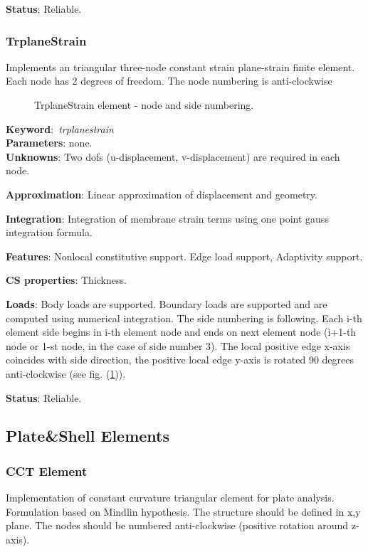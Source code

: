 \documentclass[12pt,dvips]{article}
\newcommand{\descitem}[1]{{\noindent \bf #1}:}
\newcommand{\elemkeyword}[1]{\descitem{Keyword}~{\em #1}}
\begin{document}
\descitem{Status} Reliable.


\subsubsection{TrplaneStrain}
Implements an triangular three-node  constant strain plane-strain  
finite element. Each node has 2 degrees of freedom.
The node numbering is anti-clockwise

\begin{figure}[htb]
\begin{center}\end{center}
\caption{TrplaneStrain element - node and side numbering.}
\label{TrplaneStrain}
\end{figure}

\elemkeyword{trplanestrain}\\
\descitem{Parameters} none.\\
\descitem{Unknowns}
Two dofs (u-displacement, v-displacement) are required in each node.

\descitem{Approximation} Linear approximation of displacement and
geometry.

\descitem{Integration}
Integration of membrane strain terms using one point gauss integration formula.

\descitem{Features} Nonlocal constitutive support. Edge load
support, Adaptivity support.

\descitem{CS properties} Thickness. 

\descitem{Loads} Body loads are supported. Boundary loads are
supported and are computed  using numerical integration. The side numbering is
following. Each i-th element side begins in i-th element node and
ends on next element node (i+1-th node or 1-st node, in the case of 
side number 3). The local positive edge x-axis coincides with side
direction, the positive local edge y-axis is rotated 90 degrees
anti-clockwise (see fig. (\ref{TrplaneStrain})).

\descitem{Status} Reliable.



\subsection{Plate\&Shell Elements}
\subsubsection {CCT Element}
Implementation of constant curvature triangular element for plate
analysis. Formulation based on Mindlin hypothesis. The structure should be defined in x,y plane. 
The nodes should be numbered anti-clockwise (positive rotation around
z-axis). 
\end{document}

